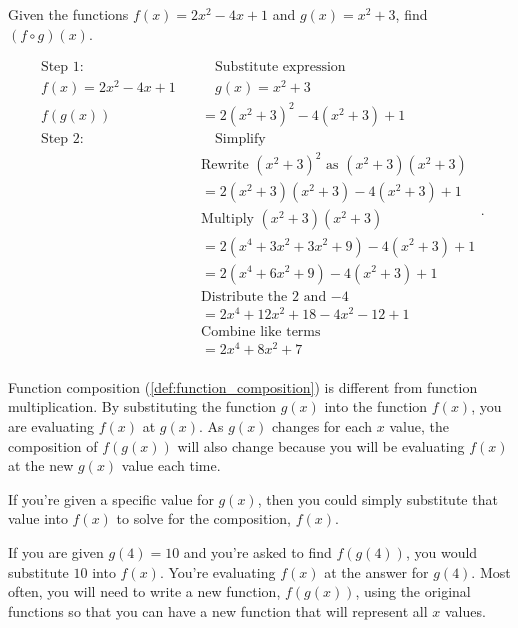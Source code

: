 \begin{example}
  \label{exm:function_composition_of_polynomials_1}

  Given the functions $f(x) = 2x^{2} - 4x + 1$ and $g(x) = x^{2} + 3$, find
  $(f \circ g)(x)$.
  
  \begin{equation}
    \label{eqt:function_composition_of_polynomials}
    \begin{split}
      \textrm{Step 1:} \quad & \quad \textrm{Substitute expression} \\
      f(x) = 2x^{2} - 4x + 1 \quad & \quad g(x) = x^{2} + 3 \\
      f(g(x)) &= 2(x^{2} + 3)^{2} - 4(x^{2} + 3) + 1 \\
      \textrm{Step 2:} \quad & \quad \textrm{Simplify} \\
                & \textrm{Rewrite $(x^{2} + 3)^{2}$ as $(x^{2} + 3)(x^{2} + 3)$} \\
              &= 2(x^{2} + 3)(x^{2} + 3) - 4(x^{2} + 3) + 1 \\
                & \textrm{Multiply $(x^{2} + 3)(x^{2} + 3)$} \\
              &= 2(x^{4} + 3x^{2} + 3x^{2} + 9) - 4(x^{2} + 3) + 1 \\
              &= 2(x^{4} + 6x^{2} + 9) - 4(x^{2} + 3) + 1 \\
                & \textrm{Distribute the $2$ and $-4$} \\
              &= 2x^{4} + 12x^{2} + 18 - 4x^{2} - 12 + 1 \\
                & \textrm{Combine like terms} \\
              &= \boxed{2x^{4} + 8x^{2} + 7} \\
    \end{split}
  .\end{equation}
\end{example}

Function composition (\ref{def:function_composition}) is different from function
multiplication. By substituting the function $g(x)$ into the function $f(x)$,
you are evaluating $f(x)$ at $g(x)$. As $g(x)$ changes for each $x$ value, the
composition of $f(g(x))$ will also change because you will be evaluating $f(x)$
at the new $g(x)$ value each time.

If you're given a specific value for $g(x)$, then you could simply substitute
that value into $f(x)$ to solve for the composition, $f(x)$.

\begin{example}
  \label{exm:function_composition_of_polynomials_2}

  If you are given $g(4) = 10$ and you're asked to find $f(g(4))$, you would
  substitute $10$ into $f(x)$. You're evaluating $f(x)$ at the answer for
  $g(4)$. Most often, you will need to write a new function, $f(g(x))$, using
  the original functions so that you can have a new function that will represent
  all $x$ values.
\end{example}

